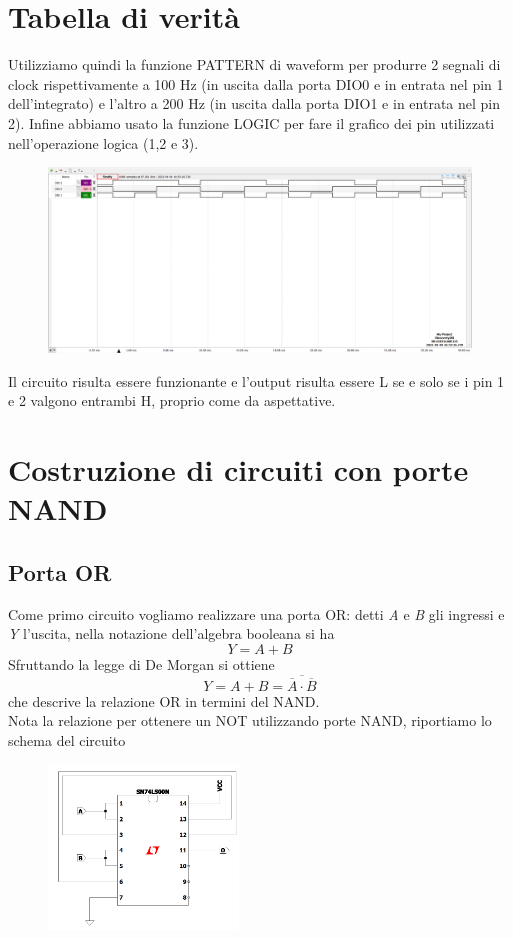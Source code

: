\documentclass[10pt, a4paper, italian]{article}
\begin{document}
\begin{figure}
    \label{fig: NAND}
\end{figure}

\section{Tabella di verità}
Utilizziamo quindi la funzione PATTERN di waveform per produrre 2 segnali di clock rispettivamente a 100 Hz (in uscita dalla porta DIO0 e in entrata nel pin 1 dell'integrato) e l'altro a 200 Hz (in uscita dalla porta DIO1 e in entrata nel pin 2). Infine abbiamo usato la funzione LOGIC per fare il grafico dei pin utilizzati nell'operazione logica (1,2 e 3). 
\begin{figure}
	\includegraphics[scale=0.4]{nand_time}
	\label{nand_time}
\end{figure}
Il circuito risulta essere funzionante e l'output risulta essere L se e solo se i pin 1 e 2 valgono entrambi H, proprio come da aspettative.

\section{Costruzione di circuiti con porte NAND}
\subsection{Porta OR}
Come primo circuito vogliamo realizzare una porta OR: detti \textit{A} e \textit{B} gli ingressi e \textit{Y} l'uscita, nella notazione dell'algebra booleana si ha
\[
    Y = A + B
\]
Sfruttando la legge di De Morgan si ottiene
\[
    Y = A + B = \overline{\overline{A}\cdot\overline{B}}
\]
che descrive la relazione OR in termini del NAND.\\
Nota la relazione per ottenere un NOT utilizzando porte NAND, riportiamo lo schema del circuito
\begin{figure}[htbp]
    \centering
    \includegraphics[width=0.45\textwidth]{NAND_OR}
    \caption{\label{fig: OR}}
\end{figure}
\end{document}
